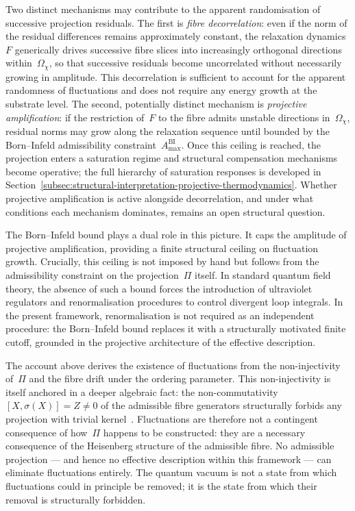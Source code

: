   Two distinct mechanisms may contribute to the apparent randomisation of successive
  projection residuals.
  The first is \emph{fibre decorrelation}: even if the norm of the residual differences
  remains approximately constant, the relaxation dynamics~$F$ generically drives
  successive fibre slices into increasingly orthogonal directions within~$\Omega_\chi$,
  so that successive residuals become uncorrelated without necessarily growing in
  amplitude.
  This decorrelation is sufficient to account for the apparent randomness of fluctuations
  and does not require any energy growth at the substrate level.
  The second, potentially distinct mechanism is \emph{projective amplification}: if the
  restriction of~$F$ to the fibre admits unstable directions in~$\Omega_\chi$, residual
  norms may grow along the relaxation sequence until bounded by the Born--Infeld
  admissibility constraint~$A^{\mathrm{BI}}_{\max}$.
  Once this ceiling is reached, the projection enters a saturation regime and structural
  compensation mechanisms become operative; the full hierarchy of saturation responses
  is developed in
  Section~\ref{subsec:structural-interpretation-projective-thermodynamics}.
  Whether projective amplification is active alongside decorrelation, and under what
  conditions each mechanism dominates, remains an open structural question.

  The Born--Infeld bound plays a dual role in this picture.
  It caps the amplitude of projective amplification, providing a finite structural ceiling
  on fluctuation growth.
  Crucially, this ceiling is not imposed by hand but follows from the admissibility
  constraint on the projection~$\Pi$ itself.
  In standard quantum field theory, the absence of such a bound forces the introduction
  of ultraviolet regulators and renormalisation procedures to control divergent loop
  integrals.
  In the present framework, renormalisation is not required as an independent procedure:
  the Born--Infeld bound replaces it with a structurally motivated finite cutoff,
  grounded in the projective architecture of the effective description.

  \begin{remark}
    \label{rem:fluctuations-algebraic}
    The account above derives the existence of fluctuations from the non-injectivity
    of~$\Pi$ and the fibre drift under the ordering parameter.
    This non-injectivity is itself anchored in a deeper algebraic fact: the
    non-commutativity $[X,\sigma(X)] = Z \neq 0$ of the admissible fibre generators
    structurally forbids any projection with trivial kernel~\cite{Beau2026m}.
    Fluctuations are therefore not a contingent consequence of how~$\Pi$ happens
    to be constructed: they are a necessary consequence of the Heisenberg structure
    of the admissible fibre.
    No admissible projection — and hence no effective description within this framework
    — can eliminate fluctuations entirely.
    The quantum vacuum is not a state from which fluctuations could in principle be
    removed; it is the state from which their removal is structurally forbidden.
  \end{remark}
